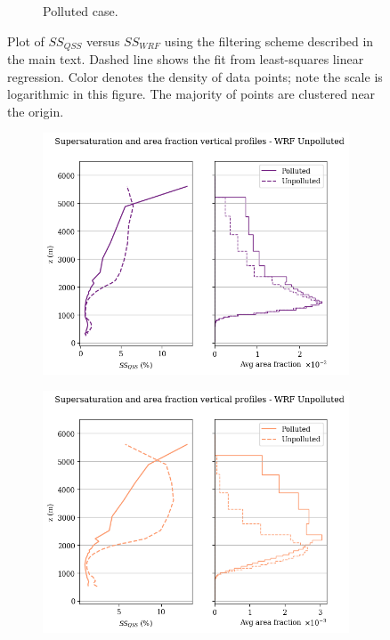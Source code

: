 \documentclass{article}
\begin{document}
\begin{figure}[ht]
\begin{subfigure}{0.7\textwidth}
		\caption{Polluted case.}
		\label{wrfvsqsspoll}
	\end{subfigure}
	\caption{Plot of $SS_{QSS}$ versus $SS_{WRF}$ using the filtering scheme described in the main text. Dashed line shows the fit from least-squares linear regression. Color denotes the density of data points; note the scale is logarithmic in this figure. The majority of points are clustered near the origin.}
	\label{wrfvsqss}
\end{figure}

\begin{figure}[ht]
	\centering
	\begin{subfigure}{0.7\textwidth}
		\includegraphics[width=\textwidth]{revmywrf/v20_FINAL_bipanel_ss_qss_vs_z_allpts_figure.png}
		\caption{}
		\label{wrfbipanelallpts}
	\end{subfigure}
	\begin{subfigure}{0.7\textwidth}
		\includegraphics[width=\textwidth]{revmywrf/v20_FINAL_bipanel_ss_qss_vs_z_up10perc_figure.png}

\end{subfigure}
\end{figure}
\end{document}
